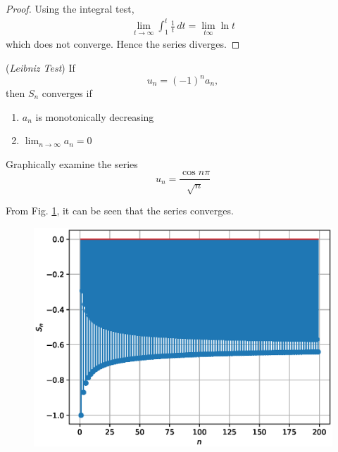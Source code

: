 \documentclass[journal,12pt,twocolumn]{IEEEtran}
\begin{document}
\begin{proof}
Using the integral test,
\begin{align}
\lim_{t \rightarrow \infty}\int_{1}^{t}\frac{1}{t}\, dt = \lim_{t \infty}\ln t
\end{align}
which does not converge.  Hence the series diverges.
\end{proof}
\begin{proposition}
\label{prop:leibniz}
({\em Leibniz Test}) If
\begin{equation}
u_n = (-1)^na_n,
\end{equation}
then $S_n$ converges if
\begin{enumerate}
\item $a_n$ is monotonically decreasing
\item $\lim_{n\rightarrow \infty} a_n = 0$
\end{enumerate}
\end{proposition}
%
\begin{problem}
\label{prob:leibniz}
Graphically examine the series 
\begin{equation}
u_n = \frac{\cos n\pi}{\sqrt{n}}
\end{equation}
\end{problem}
\solution From Fig. \ref{fig:7}, it can be seen that the series converges.
%

%
\begin{figure}[!ht]
\begin{center}
\includegraphics[width=\columnwidth]{./figs/7.eps}
\end{center}
\label{fig:7}	
\end{figure}
\end{document}

